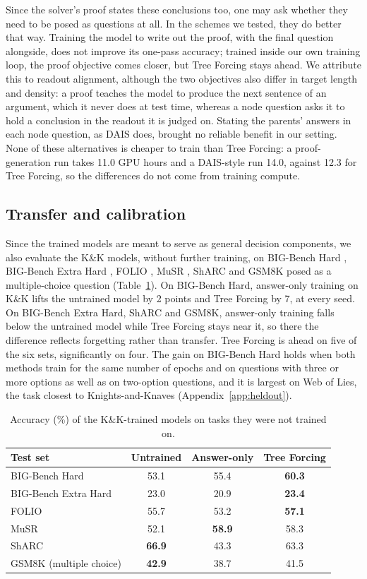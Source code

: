 \documentclass[10pt]{article}
\newcommand{\tf}{Tree Forcing}
\begin{document}
Since the solver's proof states these conclusions too, one may ask whether they need to be posed as questions at all.
In the schemes we tested, they do better that way. Training the model to write out the proof, with the final question
alongside, does not improve its one-pass accuracy; trained inside our own training loop, the proof objective comes
closer, but \tf{} stays ahead. We attribute this to
readout alignment, although the two objectives also differ in target length and density: a proof teaches the model to
produce the next sentence of an argument, which it never does at test time, whereas a node question asks it to hold a
conclusion in the readout it is judged on. Stating the parents' answers in each node question, as DAIS does, brought
no reliable benefit in our setting. None of these alternatives is cheaper to train than \tf{}: a proof-generation run
takes 11.0 GPU hours and a DAIS-style run 14.0, against 12.3 for \tf{}, so the differences do not come from training
compute.

\subsection{Transfer and calibration}
\label{sec:transfer}

Since the trained models are meant to serve as general decision components, we also evaluate the K\&K models, without
further training, on BIG-Bench Hard \citep{suzgun2022bbh}, BIG-Bench Extra Hard \citep{kazemi2025bbeh}, FOLIO
\citep{han2022folio}, MuSR \citep{sprague2023musr}, ShARC \citep{saeidi2018sharc} and GSM8K posed as a
multiple-choice question (Table~\ref{tab:transfer}). On BIG-Bench Hard, answer-only training on K\&K lifts the untrained
model by 2 points and \tf{} by 7, at every seed. On BIG-Bench Extra Hard, ShARC and GSM8K, answer-only training falls
below the untrained model while \tf{} stays near it, so there the difference reflects forgetting rather than transfer.
\tf{} is ahead on five of the six sets, significantly on four. The gain on BIG-Bench Hard holds when both methods train
for the same number of epochs and on questions with three or more options as well as on two-option questions, and it is
largest on Web of Lies, the task closest to Knights-and-Knaves (Appendix~\ref{app:heldout}).

\begin{table}[t]
\centering
\small
\caption{Accuracy (\%) of the K\&K-trained models on tasks they were not trained on.}
\label{tab:transfer}
\begin{tabular}{lccc}
\toprule
Test set & Untrained & Answer-only & \tf{} \\
\midrule
BIG-Bench Hard & 53.1 & 55.4 & \textbf{60.3} \\
BIG-Bench Extra Hard & 23.0 & 20.9 & \textbf{23.4} \\
FOLIO & 55.7 & 53.2 & \textbf{57.1} \\
MuSR & 52.1 & \textbf{58.9} & 58.3 \\
ShARC & \textbf{66.9} & 43.3 & 63.3 \\
GSM8K (multiple choice) & \textbf{42.9} & 38.7 & 41.5 \\
\bottomrule
\end{tabular}
\end{table}
\end{document}
